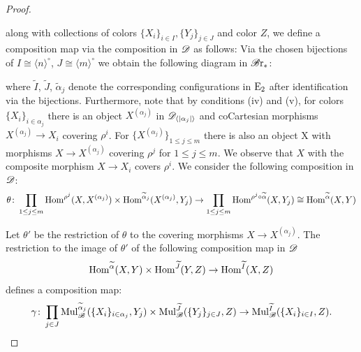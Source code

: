 \begin{proof}
\begin{center}
        \end{center}
    along with collections of colors $\{X_i\}_{i \in I}, \{Y_j\}_{j \in J}$ and
    color $Z$, we define a composition map via the composition in $\mathscr{D}$ as
    follows: Via the chosen bijections of $I \cong \langle n \rangle^{\circ}$, $J
    \cong \langle m \rangle^{\circ}$ we obtain the following diagram in $\mathscr{B} \text{r}_{\ast}$:
    \begin{center}
    \end{center}
    where $\widetilde{I}$, $\widetilde{J}$, $\widetilde{\alpha}_j$ denote the
    corresponding configurations in $\operatorname{E}_2$ after identification via the
    bijections. Furthermore, note that by conditions (iv) and (v), for  colors
    $\{X_i\}_{i \in \alpha_j}$ there is an object $X^{(\alpha_j)}$ in
    $\mathscr{D}_{\langle |\alpha_j| \rangle}$ and coCartesian morphisms $X^{(\alpha_j)} \to X_i$
    covering $\rho^i$. For $\{X^{(\alpha_j)}\}_{1 \leq j \leq m}$ there is also
    an object X with morphisms $X \to X^{(\alpha_j)}$ covering $\rho^j$ for $1 \leq
    j \leq m$. We observe that $X$ with the composite morphism $X \to X_i$ covers
    $\rho^i$. We consider the following composition in $\mathscr{D}$:
    \[
       \theta \colon \prod_{1 \leq j \leq m} \operatorname{Hom}^{\rho^j}(X, X^{(\alpha_j)}) \times \operatorname{Hom}^{\widetilde{\alpha}_j}(X^{(\alpha_j)}, Y_j) \to \prod_{1 \leq j \leq m} \operatorname{Hom}^{\rho^j \circ \widetilde{\alpha}} (X, Y_j) \cong \operatorname{Hom}^{\widetilde{\alpha}}(X, Y)
    \]

    Let $\theta'$ be the restriction of $\theta$ to the covering morphisms $X
    \to X^{(\alpha_j)}$. The restriction to the image of $\theta'$ of the
    following composition map in $\mathscr{D}$
    \[
        \operatorname{Hom}^{\widetilde{\alpha}}(X, Y) \times \operatorname{Hom}^{\widetilde{J}}(Y, Z) \to \operatorname{Hom}^{\widetilde{I}}(X, Z)
    \]
    defines a composition map:
    \[
        \gamma \colon \prod_{j \in J} \operatorname{Mul}_{\mathscr{B}}^{\widetilde{\alpha}_j}(\{X_i\}_{i \in \alpha_j}, Y_j) \times \operatorname{Mul}_{\mathscr{B}}^{\widetilde{J}}(\{Y_j\}_{j \in J}, Z) \to \operatorname{Mul}_{\mathscr{B}}^{\widetilde{I}}(\{X_i\}_{i \in I}, Z).
    \]


\end{proof}

